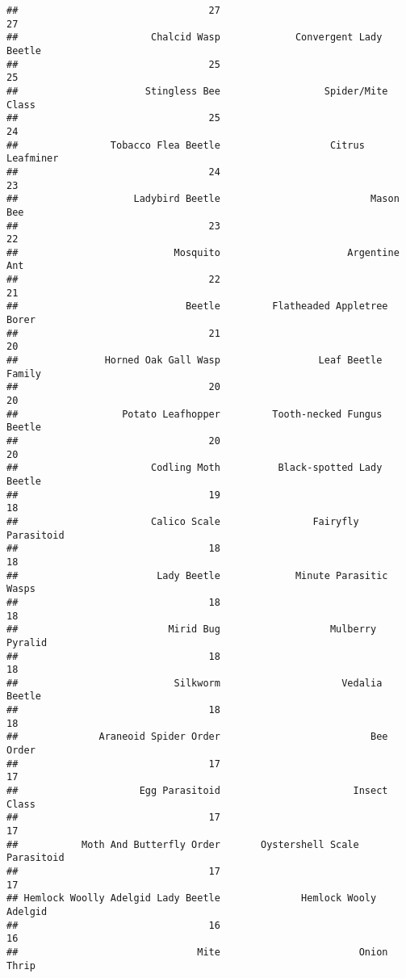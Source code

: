 \documentclass[]{article}
\begin{document}
\begin{verbatim}
##                                 27                                 27 
##                       Chalcid Wasp             Convergent Lady Beetle 
##                                 25                                 25 
##                      Stingless Bee                  Spider/Mite Class 
##                                 25                                 24 
##                Tobacco Flea Beetle                   Citrus Leafminer 
##                                 24                                 23 
##                    Ladybird Beetle                          Mason Bee 
##                                 23                                 22 
##                           Mosquito                      Argentine Ant 
##                                 22                                 21 
##                             Beetle         Flatheaded Appletree Borer 
##                                 21                                 20 
##               Horned Oak Gall Wasp                 Leaf Beetle Family 
##                                 20                                 20 
##                  Potato Leafhopper         Tooth-necked Fungus Beetle 
##                                 20                                 20 
##                       Codling Moth          Black-spotted Lady Beetle 
##                                 19                                 18 
##                       Calico Scale                Fairyfly Parasitoid 
##                                 18                                 18 
##                        Lady Beetle             Minute Parasitic Wasps 
##                                 18                                 18 
##                          Mirid Bug                   Mulberry Pyralid 
##                                 18                                 18 
##                           Silkworm                     Vedalia Beetle 
##                                 18                                 18 
##              Araneoid Spider Order                          Bee Order 
##                                 17                                 17 
##                     Egg Parasitoid                       Insect Class 
##                                 17                                 17 
##           Moth And Butterfly Order       Oystershell Scale Parasitoid 
##                                 17                                 17 
## Hemlock Woolly Adelgid Lady Beetle              Hemlock Wooly Adelgid 
##                                 16                                 16 
##                               Mite                        Onion Thrip 

\end{verbatim}
\end{document}

